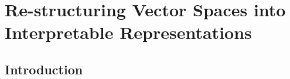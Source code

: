 \chapter{Re-structuring Vector Spaces into Interpretable Representations}\label{Chapter3}


\section{Introduction}\label{chapter3:Introduction}

